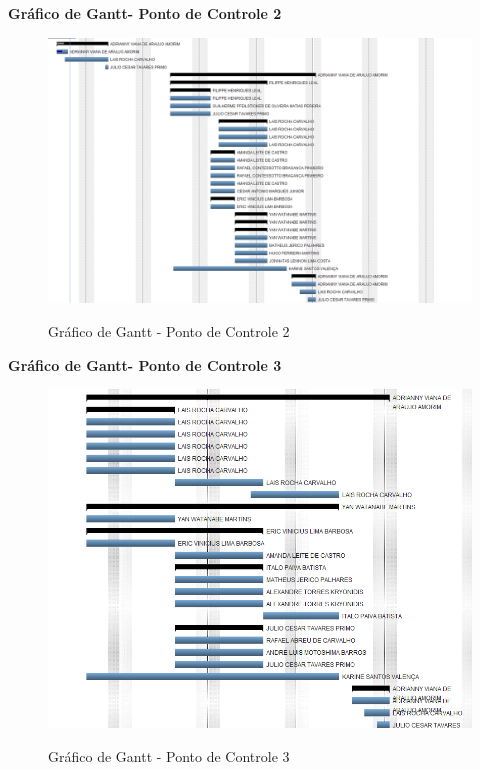  \pagebreak
  \textbf{Gráfico de Gantt- Ponto de Controle 2}
   \begin{figure}[!h]
    \centering
    \includegraphics[scale = 0.5]{editaveis/figuras/ganttPC2}
    \label{Gráfico de Gantt PC2}
    \caption{Gráfico de Gantt - Ponto de Controle 2}
   \end{figure}
   \FloatBarrier
   
  \pagebreak
  \textbf{Gráfico de Gantt- Ponto de Controle 3}
   \begin{figure}[!h]
    \centering
    \includegraphics[scale = 0.5]{editaveis/figuras/ganttPC3}
    \label{Gráfico de Gantt PC3}
    \caption{Gráfico de Gantt - Ponto de Controle 3}
   \end{figure}
   \FloatBarrier